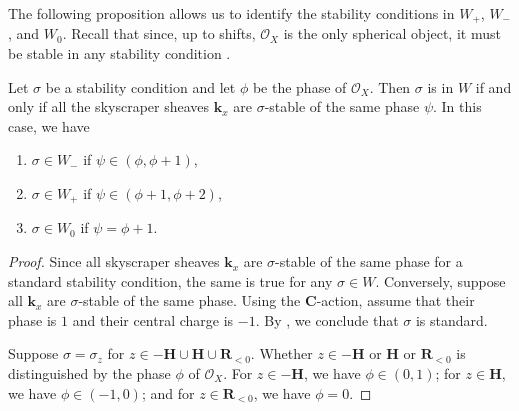 \documentclass{amsart}
\begin{document}
The following proposition allows us to identify the stability conditions in \(W_+\), \(W_{-}\), and \(W_0\).
Recall that since, up to shifts, \(\mathcal{O}_X\) is the only spherical object, it must be stable in any stability condition \cite[Proposition~2.15]{huy.mac.ste:08}.
\begin{proposition}\label{prop:type-comparison}
  Let \(\sigma\) be a stability condition and let \(\phi\) be the phase of \(\mathcal{O}_X\).
  Then \(\sigma\) is in \(W\) if and only if all the skyscraper sheaves \(\mathbf{k}_x\) are \(\sigma\)-stable of the same phase \(\psi\).
  In this case, we have
  \begin{enumerate}
  \item   \(\sigma \in W_{-}\) if \(\psi \in (\phi,\phi+1)\),
  \item  \(\sigma \in W_+\) if \(\psi \in (\phi+1,\phi+2)\),
  \item  \(\sigma \in W_0\) if \(\psi = \phi+1\).
  \end{enumerate}
\end{proposition}
\begin{proof}
  Since all skyscraper sheaves \(\mathbf{k}_x\) are \(\sigma\)-stable of the same phase for a standard stability condition, the same is true for any \(\sigma \in W\).
  Conversely, suppose all \(\mathbf{k}_x\) are \(\sigma\)-stable of the same phase.
  Using the \(\mathbf{C}\)-action, assume that their phase is \(1\) and their central charge is \(-1\).
  By \cite[Proposition~4.6]{huy.mac.ste:08}, we conclude that \(\sigma\) is standard.

  Suppose \(\sigma = \sigma_z\) for \(z \in -\mathbf{H} \cup \mathbf{H} \cup \mathbf{R}_{<0}\).
  Whether \(z \in -\mathbf{H}\) or \(\mathbf{H}\) or \(\mathbf{R}_{<0}\) is distinguished by the phase \(\phi\) of \(\mathcal{O}_X\).
  For \(z \in -\mathbf{H}\), we have \(\phi \in (0,1)\);
  for \(z \in \mathbf{H}\), we have \(\phi \in (-1,0)\);
  and for \(z \in \mathbf{R}_{<0}\), we have \(\phi = 0\).
\end{proof}
\end{document}
